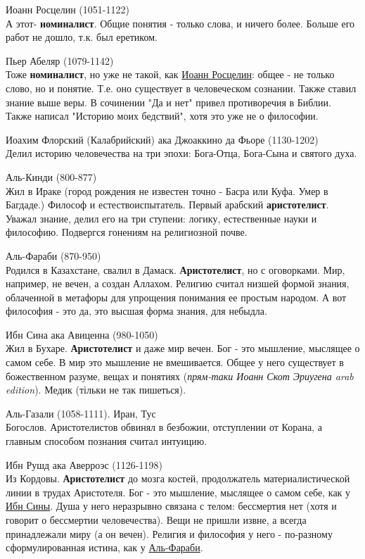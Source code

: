 \documentclass[12pt,a4paper]{article}
\begin{document}
Иоанн Росцелин (1051-1122)\\
А этот- \textbf{номиналист}. Общие понятия - только слова, и ничего более. Больше его работ не дошло, т.к. был еретиком.

Пьер Абеляр (1079-1142)\\
Тоже \textbf{номиналист}, но уже не такой, как \underline{Иоанн Росцелин}: общее - не только слово, но и понятие. Т.е. оно существует в человеческом сознании. Также ставил знание выше веры. В сочинении "Да и нет" привел противоречия в Библии. Также написал "Историю моих бедствий", хотя это уже не о философии.

Иоахим Флорский (Калабрийский) ака Джоаккино да Фьоре  (1130-1202)\\
Делил историю человечества на три эпохи: Бога-Отца, Бога-Сына и святого духа.

Аль-Кинди (800-877)\\
Жил в Ираке (город рождения не известен точно - Басра или Куфа. Умер в Багдаде.) Философ и естествоиспытатель. Первый арабский \textbf{аристотелист}. Уважал знание, делил его на три ступени: логику, естественные науки и философию. Подвергся гонениям на религиозной почве.

Аль-Фараби (870-950)\\
Родился в Казахстане, свалил в Дамаск. \textbf{Аристотелист}, но с оговорками. Мир, например, не вечен, а создан Аллахом. Религию считал низшей формой знания, облаченной в метафоры для упрощения понимания ее простым народом. А вот философия - это да, это высшая форма знания, для небыдла.

Ибн Сина ака Авиценна (980-1050)\\
Жил в Бухаре. \textbf{Аристотелист} и даже мир вечен. Бог - это мышление, мыслящее о самом себе. В мир это мышление не вмешивается. Общее у него существует в божественном разуме, вещах и понятиях (\textit{прям-таки Иоанн Скот Эриугена arab edition}). Медик (тільки не так пишеться).

Аль-Газали (1058-1111). Иран, Тус\\
Богослов. Аристотелистов обвинял в безбожии, отступлении от Корана, а главным способом познания считал интуицию. 

Ибн Рушд ака Аверроэс (1126-1198)\\ 
Из Кордовы. \textbf{Аристотелист} до мозга костей, продолжатель материалистической линии в трудах Аристотеля. Бог - это мышление, мыслящее о самом себе, как у \underline{Ибн Сины}. Душа у него неразрывно связана с телом: бессмертия нет (хотя и говорит о бессмертии человечества). Вещи не пришли извне, а всегда принадлежали миру (а он вечен). Религия и философия у него - по-разному сформулированная истина, как у \underline{Аль-Фараби}.
\end{document}
